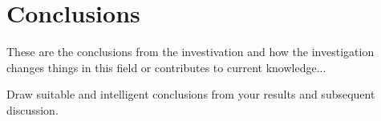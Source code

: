 \chapter{Conclusions}
\label{ch_conclusions}

These are the conclusions from the investivation and how the investigation changes things in this field or contributes to current knowledge...

Draw suitable and intelligent conclusions from your results and subsequent discussion.
